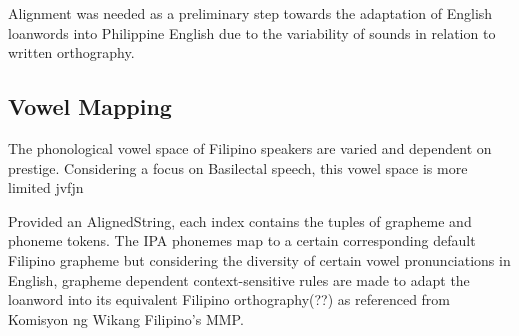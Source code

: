 Alignment was needed as a preliminary step towards the adaptation of English loanwords
into Philippine English due to the variability of sounds in relation to written orthography.

\subsection{Vowel Mapping}
The phonological vowel space of Filipino speakers are varied and dependent on prestige.
Considering a focus on Basilectal speech, this vowel space is more limited jvfjn

Provided an AlignedString, each index contains the tuples of grapheme and phoneme
tokens. The IPA phonemes map to a certain corresponding default Filipino grapheme but
considering the diversity of certain vowel pronunciations in English, grapheme dependent
context-sensitive rules are made to adapt the loanword into its equivalent Filipino
orthography(??) as referenced from Komisyon ng Wikang Filipino's MMP. 


